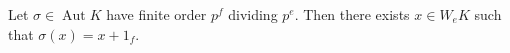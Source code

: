 Let $\sigma \in \operatorname{Aut} K$ have finite order $p^f$ dividing $p^e$. Then there exists $x \in W_e K$ such that $\sigma(x) = x + 1_f$.
